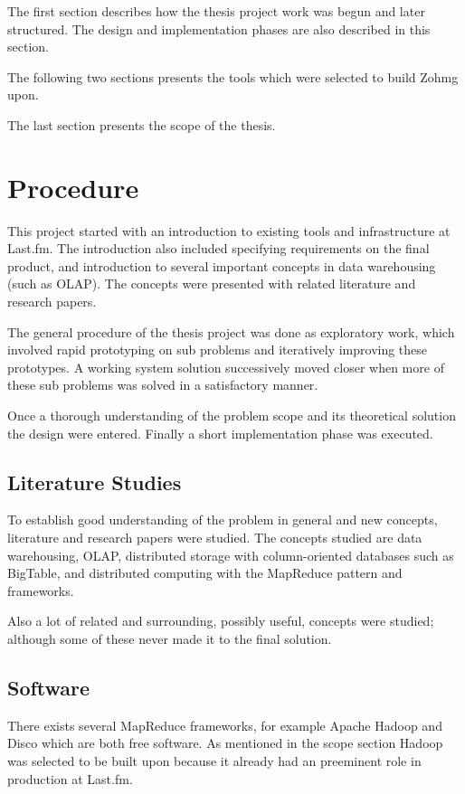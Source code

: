 The first section describes how the thesis project work was begun and later
structured. The design and implementation phases are also described in this
section.

The following two sections presents the tools which were selected to build Zohmg
upon.

The last section presents the scope of the thesis.


\section{Procedure}

This project started with an introduction to existing tools and infrastructure
at Last.fm. The introduction also included specifying requirements on the final
product, and introduction to several important concepts in data warehousing
(such as OLAP). The concepts were presented with related literature and research
papers.

The general procedure of the thesis project was done as exploratory work, which
involved rapid prototyping on sub problems and iteratively improving these
prototypes. A working system solution successively moved closer when more of
these sub problems was solved in a satisfactory manner.

Once a thorough understanding of the problem scope and its theoretical solution
the design were entered. Finally a short implementation phase was executed.


\subsection*{Literature Studies}

To establish good understanding of the problem in general and new concepts,
literature and research papers were studied. The concepts studied are data
warehousing, OLAP, distributed storage with column-oriented databases such
as BigTable, and distributed computing with the MapReduce pattern and
frameworks.

Also a lot of related and surrounding, possibly useful, concepts were studied;
although some of these never made it to the final solution.
\cite{piglatin,mapreducemerge}


\subsection*{Software}

There exists several MapReduce frameworks, for example Apache Hadoop and
Disco\cite{disco} which are both free software. As mentioned in the scope
section Hadoop was selected to be built upon because it already had an
preeminent role in production at Last.fm.

